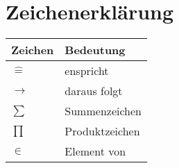 \documentclass[12pt,a4paper,fleqn,twoside,pdf,final]{article}
\begin{document}
\section{Zeichenerklärung}

\begin{tabular}[h]{l|l}
Zeichen &Bedeutung  \\
\hline
$\widehat{=}$ & enspricht  \\
$\longrightarrow$ & daraus folgt \\
$\sum$ & Summenzeichen \\
$\prod$ & Produktzeichen \\
$ \in$ & Element von \\
\end{tabular}
\end{document}
